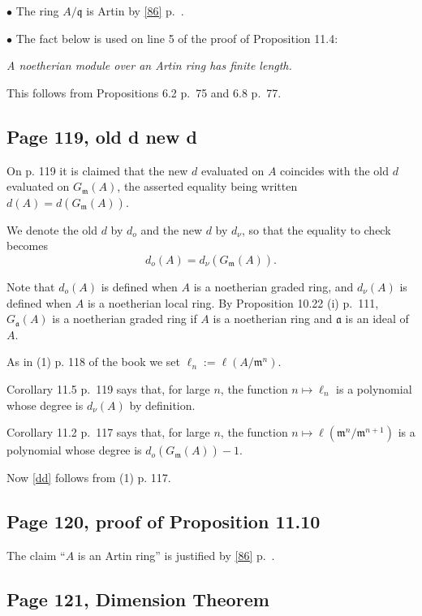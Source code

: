 \documentclass[parskip=half,fontsize=12pt]{scrartcl}%
\newcommand{\mf}{\mathfrak}
\newcommand{\aaa}{\mf a}
\newcommand{\mmm}{\mf m}
\newcommand{\qqq}{\mf q}
\newcommand{\bu}{\bullet}
\begin{document}
$\bu$ The ring $A/\qqq$ is Artin by \eqref{86} p.~\pageref{86}.

$\bu$ The fact below is used on line 5 of the proof of Proposition 11.4:

\emph{A noetherian module over an Artin ring has finite length.}

This follows from Propositions 6.2 p.~75 and 6.8 p.~77.

\subsection{Page 119, old d new d}\label{odnd}%

On p. 119 it is claimed that the new $d$ evaluated on $A$ coincides with the old $d$ evaluated on $G_\mmm(A)$, the asserted equality being written $d(A)=d(G_\mmm(A))$. 

We denote the old $d$ by $d_o$ and the new $d$ by $d_\nu$, so that the equality to check becomes 
\begin{equation}\label{dd}
d_o(A)=d_\nu(G_\mmm(A)).
\end{equation}

Note that $d_o(A)$ is defined when $A$ is a noetherian graded ring, and $d_\nu(A)$ is defined when $A$ is a noetherian local ring. By Proposition 10.22 (i) p.~111, $G_\aaa(A)$ is a noetherian graded ring if $A$ is a noetherian ring and $\aaa$ is an ideal of $A$.

As in (1) p. 118 of the book we set $\ell_n:=\ell(A/\mmm^n)$. 

Corollary 11.5 p.~119 says that, for large $n$, the function $n\mapsto\ell_n$ is a polynomial whose degree is $d_\nu(A)$ by definition. 

Corollary 11.2 p.~117 says that, for large $n$, the function $n\mapsto\ell(\mmm^n/\mmm^{n+1})$ is a polynomial whose degree is $d_o(G_\mmm(A))-1$.

Now \eqref{dd} follows from (1) p. 117.

\subsection{Page 120, proof of Proposition 11.10}%

The claim ``$A$ is an Artin ring'' is justified by \eqref{86} p.~\pageref{86}.

\subsection{Page 121, Dimension Theorem}\label{dt}%
\end{document}
